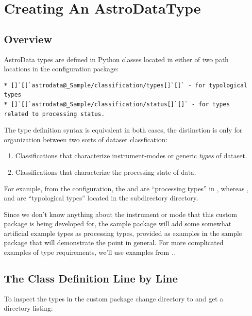 \documentclass[letterpaper,10pt,english]{sphinxmanual}
\begin{document}
\section{Creating An AstroDataType}
\label{creatingAnAstroDataType:creating-an-astrodatatype}\label{creatingAnAstroDataType::doc}

\subsection{Overview}
\label{creatingAnAstroDataType:overview}
AstroData types are defined in Python classes located in either of two path
locations in the configuration package:

\begin{Verbatim}[commandchars=@\[\]]
* []`[]`astrodata@_Sample/classification/types[]`[]` - for typological types
* []`[]`astrodata@_Sample/classification/status[]`[]` - for types related to processing status.
\end{Verbatim}

The type definition syntax is equivalent in both cases,
the distinction is only for organization between two
sorts of dataset classfication:
\begin{enumerate}
\item {} 
Classifications that characterize instrument-modes or generic \emph{types}
of dataset.

\item {} 
Classifications that characterize the processing state of data.

\end{enumerate}

For example, from the  configuration, the  and
 are ``processing types'' in , whereas
,  and  are ``typological types'' located in the
 subdirectory directory.

Since we don't know anything about the instrument or mode that this  custom package is
being developed for, the sample package will add some somewhat artificial example types
as processing types,  provided as examples in the sample package that will demonstrate
the point in general. For more complicated examples of type requirements, we'll
use examples from ..


\subsection{The Class Definition Line by Line}
\label{creatingAnAstroDataType:the-class-definition-line-by-line}
To inspect the types in the custom package change
directory to  and get a directory
listing:
\end{document}
